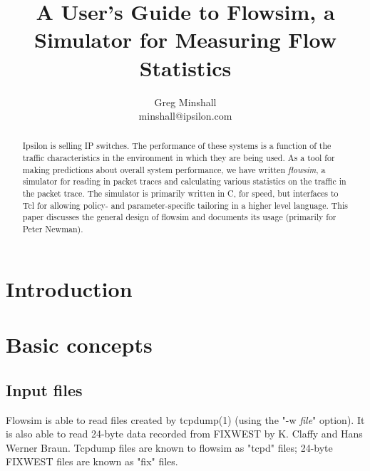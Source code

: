 \documentclass{article}
\begin{document}
\newcommand{\NAME}{\item[NAME]}
\newcommand{\SYNOPSIS}{\item[SYNOPSIS]}
\newcommand{\DESCRIPTION}{\item[DESCRIPTION]}
\newcommand{\KEYWORDS}{\item[KEYWORDS]}
\newcommand{\SEEALSO}{\item[SEE ALSO]}
\newcommand{\BUGS}{\item[BUGS]}

\newcommand{\cmd}[1]{\textbf{#1}}
\newcommand{\cmdarg}[1]{\textit{#1}}

\title{A User's Guide to Flowsim, a Simulator for Measuring Flow Statistics}

\author{Greg Minshall \\ minshall@ipsilon.com}

\maketitle

\begin{abstract}
Ipsilon is selling IP switches.  The performance of these systems is a
function of the traffic characteristics in the environment in which
they are being used.  As a tool for making predictions about overall
system performance, we have written \emph{flowsim}, a simulator for
reading in packet traces and calculating various statistics on the
traffic in the packet trace.  The simulator is primarily written in C,
for speed, but interfaces to Tcl for allowing policy- and
parameter-specific tailoring in a higher level language.
This paper discusses the general design of flowsim and documents its
usage (primarily for Peter Newman).
\end{abstract}

\section{Introduction}

\section{Basic concepts}
\subsection{Input files}
Flowsim is able to read files created by tcpdump(1) (using the "-w
\emph{file}" option).  It is also able to read 24-byte data recorded
from FIXWEST by K. Claffy and Hans Werner Braun.  Tcpdump files are
known to flowsim as "tcpd" files; 24-byte FIXWEST files are known as
"fix" files.
\end{document}
